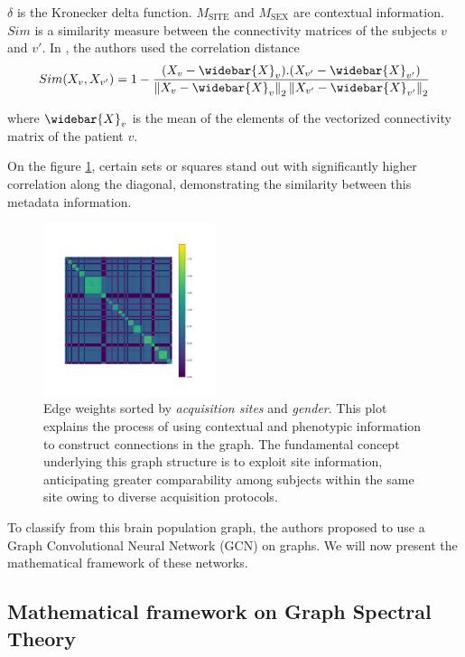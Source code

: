 $\delta$ is the Kronecker delta function.  $M_{\text{SITE}}$ and $M_{\text{SEX}}$ are contextual information. $Sim$ is a similarity measure between the connectivity matrices of the subjects $v$ and $v'$. In \cite{Parisot17}, the authors used the correlation distance 
$$
Sim(X_v, X_{v'}) =  1 - \frac{(X_v - \widebar{X}_v).(X_{v'} - \widebar{X}_{v'})}{\norm{X_v -\widebar{X}_{v}}_2\norm{X_{v'} - \widebar{X}_{v'}}_2}
$$

where $\widebar{X}_v$ is the mean of the elements of the vectorized connectivity matrix of the patient $v$. 




On the figure \ref{fig:sorted_adjacency}, certain sets or squares stand out with significantly higher correlation along the diagonal, demonstrating the similarity between this metadata information. 

\begin{figure}[h!]
    \centering
    \includegraphics[width=0.45\textwidth]{figures/sorted_adjacency_by_site_id_by_sex.png}
    \caption{Edge weights sorted by \textit{acquisition sites} and \textit{gender}. This plot explains the process of using contextual and phenotypic information to construct connections in the graph. The fundamental concept underlying this graph structure is to exploit site information, anticipating greater comparability among subjects within the same site owing to diverse acquisition protocols.}
    \Description{}
    \label{fig:sorted_adjacency}
\end{figure}

To classify from this brain population graph, the authors \cite{Parisot17} proposed to use a Graph Convolutional Neural Network (GCN) on graphs. We will now present the mathematical framework of these networks.

\subsection{Mathematical framework on Graph Spectral Theory}

